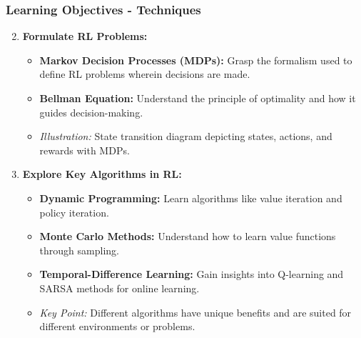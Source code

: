\documentclass[aspectratio=169]{beamer}
\begin{document}
\begin{frame}[fragile]
    \frametitle{Learning Objectives - Techniques}
    \begin{enumerate}
        \setcounter{enumi}{1} %
        \item \textbf{Formulate RL Problems:}
        \begin{itemize}
            \item \textbf{Markov Decision Processes (MDPs):} Grasp the formalism used to define RL problems wherein decisions are made.
            \item \textbf{Bellman Equation:} Understand the principle of optimality and how it guides decision-making.
            \item \textit{Illustration:} State transition diagram depicting states, actions, and rewards with MDPs.
        \end{itemize}

        \item \textbf{Explore Key Algorithms in RL:}
        \begin{itemize}
            \item \textbf{Dynamic Programming:} Learn algorithms like value iteration and policy iteration.
            \item \textbf{Monte Carlo Methods:} Understand how to learn value functions through sampling.
            \item \textbf{Temporal-Difference Learning:} Gain insights into Q-learning and SARSA methods for online learning.
            \item \textit{Key Point:} Different algorithms have unique benefits and are suited for different environments or problems.
        \end{itemize}
    \end{enumerate}
\end{frame}
\end{document}
